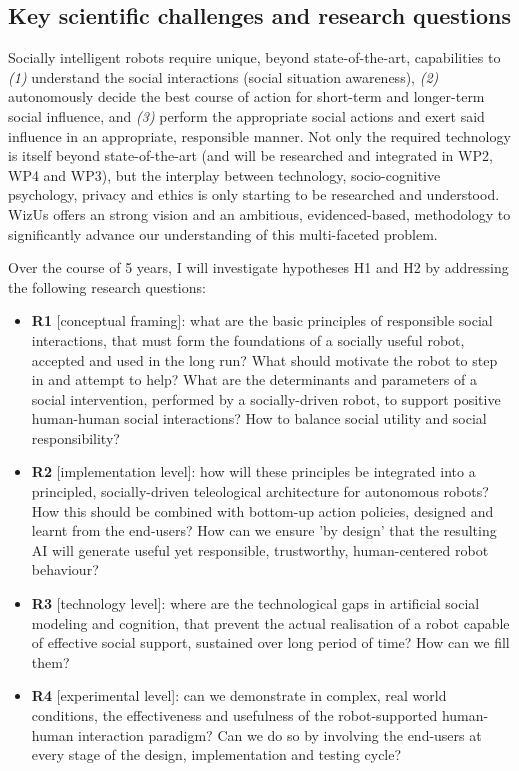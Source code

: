 \documentclass[11pt,a4paper]{report}
\newcommand{\project}{WizUs\xspace}
\begin{document}
\subsection{Key scientific challenges and research questions}

Socially intelligent robots require unique, beyond state-of-the-art,
capabilities to \emph{(1)} understand the social interactions (social
situation awareness), \emph{(2)} autonomously decide the best course of action for
short-term and longer-term social influence, and \emph{(3)} perform the
appropriate social actions and exert said influence in an appropriate,
responsible manner.
Not only the required technology is itself beyond state-of-the-art (and will be
researched and integrated in WP2, WP4 and WP3), but the
interplay between technology, socio-cognitive psychology, privacy and ethics is
only starting to be researched and understood. \project offers an
strong vision and an ambitious, evidenced-based, methodology to significantly
advance our understanding of this multi-faceted problem.

Over the course of 5 years, I will investigate hypotheses H1 and H2
by addressing the following research questions:

\begin{itemize}
    \item \textbf{R1} [conceptual framing]: what are the basic principles of
        responsible social interactions, that must form the foundations of a
        socially useful robot, accepted and used in the long run? What should
        motivate the robot to step in and attempt to help? What are the
        determinants and parameters of a social intervention, performed by a
        socially-driven robot, to support positive human-human social
        interactions? How to balance social utility and social responsibility?

    \item \textbf{R2} [implementation level]: how will these principles
        be integrated into a principled, socially-driven teleological
        architecture for autonomous robots? How this should be combined with
        bottom-up action policies, designed and learnt from the end-users? How
        can we ensure 'by design' that the resulting AI will generate useful yet
        responsible, trustworthy, human-centered robot behaviour?

    \item \textbf{R3} [technology level]: where are the technological gaps in
        artificial social modeling and cognition, that prevent the actual
        realisation of a robot capable of effective social support, sustained
        over long period of time? How can we fill them?

    \item \textbf{R4} [experimental level]: can we demonstrate in complex, real
        world conditions, the effectiveness and usefulness of the
        robot-supported human-human interaction paradigm? Can we do so by
        involving the end-users at every stage of the design, implementation and
        testing cycle?

\end{itemize}
\end{document}
